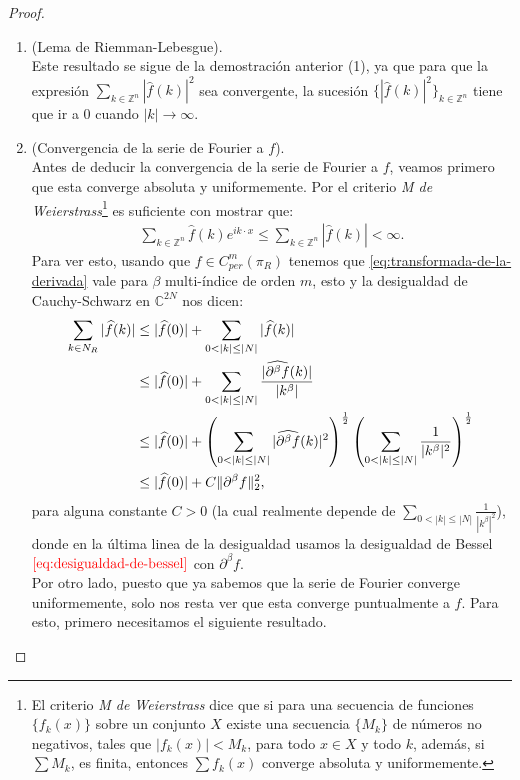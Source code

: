 \begin{proof}
\begin{enumerate}
      \item (Lema de Riemman-Lebesgue).\\
        Este resultado se sigue de la demostración anterior (1), ya que para que la expresión $\sum_{k\in\mathbb{Z}^{n}}|\hat{f}(k)|^2$ sea convergente, la sucesión $\{|\hat{f}(k)|^2\}_{k\in\mathbb{Z}^{n}}$ tiene que ir a $0$ cuando $|k|\rightarrow \infty$.
      \item (Convergencia de la serie de Fourier a $f$).\\
        Antes de deducir la convergencia de la serie de Fourier a $f$, veamos primero que esta converge absoluta y uniformemente. Por el criterio \textit{M de Weierstrass}\footnote{El criterio \textit{M de Weierstrass} dice que si para una secuencia de funciones $\{f_{k}(x)\}$ sobre un conjunto $X$ existe una secuencia $\{M_k\}$ de números no negativos, tales que $|f_{k}(x)| < M_k$, para todo $x\in X$ y todo $k$, además, si $\sum M_k$, es finita, entonces $\sum f_k(x)$ converge absoluta y uniformemente.} es suficiente con mostrar que:
        \begin{align*}
          \sum_{k\in\mathbb{Z}^{n}}\hat{f}(k)e^{ik\cdot x}\leq \sum_{k\in\mathbb{Z}^{n}}|\hat{f}(k)|<\infty.
        \end{align*}
        Para ver esto, usando que $f\in C^{m}_{per}(\pi_R)$ tenemos que \textcolor{red}{\ref{eq:transformada-de-la-derivada}} vale para $\beta$ multi-índice de orden $m$, esto y la desigualdad de Cauchy-Schwarz en $\mathbb{C}^{2N}$ nos dicen:
        \begin{align}
          \sum_{k\in N_R}|\hat{f}(k)|&\leq |\hat{f}(0)|+\sum_{0<|k|\leq |N|}|\hat{f}(k)|\notag{}\\
          &\leq |\hat{f}(0)|+\sum_{0<|k|\leq |N|}\frac{|\hat{\partial^{\beta}f}(k)|}{|k^{\beta}|}\notag{}\\
          &\leq |\hat{f}(0)|+\left( \sum_{0<|k|\leq|N|}|\hat{\partial^{\beta}f}(k)|^{2} \right)^{\frac{1}{2}}\left( \sum_{0<|k|\leq |N|}\frac{1}{|k^{\beta}|^2}\right)^{\frac{1}{2}}\notag{}\\
          &\leq |\hat{f}(0)|+C\|\partial^{\beta}f\|_{2}^{2},\label{eq:2-17}
        \end{align}
        para alguna constante $C>0$ (la cual realmente depende de $\sum_{0<|k|\leq |N|}\frac{1}{|k^{\beta}|^2}$), donde en la última linea de la desigualdad usamos la desigualdad de Bessel $\textcolor{red}{\ref{eq:desigualdad-de-bessel}}$ con $\partial^{\beta}f$.\\
        Por otro lado, puesto que ya sabemos que la serie de Fourier converge uniformemente, solo nos resta ver que esta converge puntualmente a $f$. Para esto, primero necesitamos el siguiente resultado.

\end{enumerate}
\end{proof}
